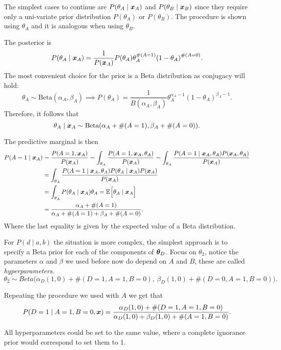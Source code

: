The simplest cases to continue are \(P(\theta_{A} \mid \bm{x}_{A})\) and
\(P(\theta_{B} \mid \bm{x}_{B})\) since they require only a uni-variate prior distribution
\(P(\theta_{A})\) or \(P(\theta_{B})\). The procedure is shown using \( \theta_A \) and it is analogous when using \( \theta_B \). 

The posterior is
\[
  P(\theta_{A} \mid \bm{x}_{A}) = \frac{1}{P(\bm{x}_{A})}P(\theta_{A})\theta_{A}^{\#(A=1)}{(1-\theta_{A})}^{\#(A=0)}.
\]
The most convenient choice for the prior is a Beta distribution as conjugacy
will hold:
\[
  \theta_{A} \sim \text{Beta}(\alpha_{A}, \beta_{A}) \implies P(\theta_{A})  = \frac{1}{B(\alpha_{A}, \beta_{A})}\theta_{A}^{\alpha_{A}-1}(1-\theta_{A})^{\beta_{A} - 1}.
\]
Therefore, it follows that
\[
  \theta_{A} \mid \bm{x}_{A} \sim \text{Beta}(\alpha_{A} + \#(A=1), \beta_{A} + \#(A = 0)).
\]

The predictive marginal is then
\[
  \begin{aligned}
    P(A = 1 \mid \bm{x}_{A})
    &= \frac{P(A = 1, \bm{x}_{A})}{P(\bm{x}_{A})} = \int_{\theta_{A}}  \frac{P(A = 1, \bm{x}_{A}, \theta_{A})}{P(\bm{x}_{A})} =  \int_{\theta_{A}}  \frac{P(A = 1 \mid \bm{x}_{A}, \theta_{A}) P(\bm{x}_{A}, \theta_{A})}{P(\bm{x}_{A})} \\
    &=  \int_{\theta_{A}}  \frac{P(A = 1 \mid \bm{x}_{A}, \theta_{A}) P(\theta_{A} \mid \bm{x}_{A})P(\bm{x}_{A})}{P(\bm{x}_{A})} \\
    &= \int_{\theta_{A}}P(\theta_{A}\mid \bm{x}_{A})\theta_{A} = \mathbb{E}_{}\Big[\theta_{A} \mid \bm{x}_{A}\Big] \\
    &= \frac{\alpha_{A} + \#(A= 1)}{\alpha_{A} + \#(A=1) + \beta_{A} + \#(A=0)}.
  \end{aligned}
\]
Where the last equality is given by the expected value of a Beta distribution.

For \(P(d \mid a ,b)\) the situation is more complex, the simplest approach
is to specify a Beta prior for each of the components of \(\bm{\theta}_{D}\).
Focus on \(\theta_{2}\), notice the parameters \(\alpha\)
and \(\beta\) we used before now do depend on \(A\) and \(B\), these
are called \emph{hyperparameters}.
\[
  \theta_{2} \sim Beta\Big(\alpha_{D}(1,0) + \#(D = 1, A = 1, B = 0), \ \beta_{D}(1,0) + \#(D = 0, A = 1, B = 0)\Big).
\]

Repeating the procedure we used with \(A\) we get that
\[
  P(D = 1 \mid A = 1, B = 0, \bm{x}) = \frac{\alpha_{D}(1,0) + \#(D = 1, A = 1, B = 0)}{\alpha_{D}(1,0) + \beta_{D}(1,0) + \#(A=1, B = 0)}.
\]

All hyperparameters could be set to the same
value, where a complete ignorance prior would correspond to set them to 1.

